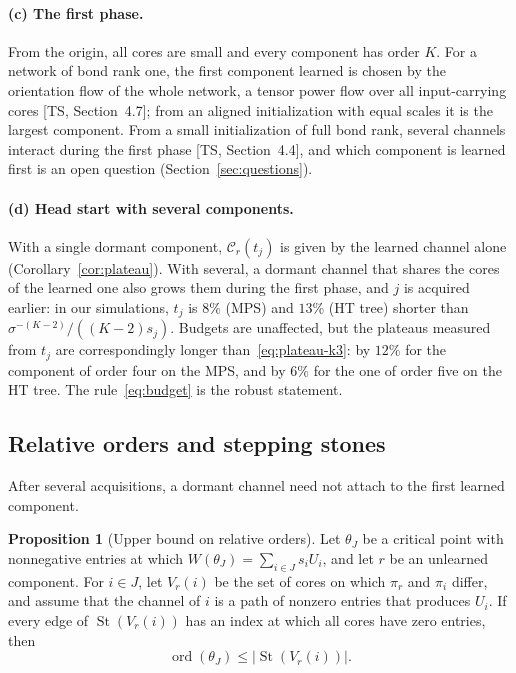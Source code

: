 \documentclass[11pt]{article}
\newcommand{\St}{\operatorname{St}}
\newcommand{\ord}{\operatorname{ord}}
\newcommand{\TS}{\textsf{TS}}
\newcommand{\ts}[1]{[\TS, #1]}
\newcommand{\Clk}{\mathcal{C}}
\theoremstyle{definition}
\newtheorem{proposition}[theorem]{Proposition}
\numberwithin{equation}{section}
\begin{document}
\paragraph{(c) The first phase.} From the origin, all cores are small and every component has order $K$. For a network of bond rank one, the first component learned is chosen by the orientation flow of the whole network, a tensor power flow over all input-carrying cores \ts{Section~4.7}; from an aligned initialization with equal scales it is the largest component. From a small initialization of full bond rank, several channels interact during the first phase \ts{Section~4.4}, and which component is learned first is an open question (Section~\ref{sec:questions}).

\paragraph{(d) Head start with several components.} With a single dormant component, $\Clk_r(t_j)$ is given by the learned channel alone (Corollary~\ref{cor:plateau}). With several, a dormant channel that shares the cores of the learned one also grows them during the first phase, and $j$ is acquired earlier: in our simulations, $t_j$ is $8\%$ (MPS) and $13\%$ (HT tree) shorter than $\sigma^{-(K-2)}/((K-2)s_j)$. Budgets are unaffected, but the plateaus measured from $t_j$ are correspondingly longer than~\eqref{eq:plateau-k3}: by $12\%$ for the component of order four on the MPS, and by $6\%$ for the one of order five on the HT tree. The rule~\eqref{eq:budget} is the robust statement.

\subsection{Relative orders and stepping stones}\label{sec:stepping}

After several acquisitions, a dormant channel need not attach to the first learned component.

\begin{proposition}[Upper bound on relative orders]\label{prop:relative-order}
Let $\theta_J$ be a critical point with nonnegative entries at which $W(\theta_J)=\sum_{i\in J}s_iU_i$, and let $r$ be an unlearned component. For $i\in J$, let $V_r(i)$ be the set of cores on which $\pi_r$ and $\pi_i$ differ, and assume that the channel of $i$ is a path of nonzero entries that produces $U_i$. If every edge of $\St(V_r(i))$ has an index at which all cores have zero entries, then
\[
\ord(\theta_J)\le\big|\St(V_r(i))\big|.
\]
\end{proposition}
\end{document}
